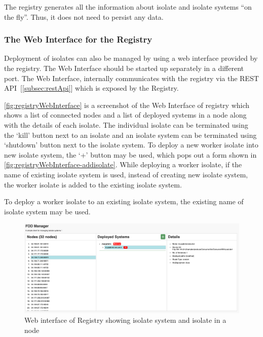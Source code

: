 The registry generates all the information about isolate and isolate systems “on the fly”. Thus, it does not need to persist any data.

  \subsubsection{The Web Interface for the Registry}
  \label{subsubsection:registryWebInterface}
  Deployment of isolates can also be managed by using a web interface provided by the registry. The Web Interface should be started up separately in a different port. The Web Interface, internally communicates with the registry via the REST API~[\ref{subsec:restApi}] which is exposed by the Registry.

  \autoref{fig:registryWebInterface} is a screenshot of the Web Interface of registry which shows a list of connected nodes and a list of deployed systems in a node along with the details of each isolate. The individual isolate can be terminated using the ‘kill’ button next to an isolate and an isolate system can be terminated using ‘shutdown’ button next to the isolate system. To deploy a new worker isolate into new isolate system, the ‘+’ button may be used, which pops out a form shown in \autoref{fig:registryWebInterface-addisolate}. While deploying a worker isolate, if the name of existing isolate system is used, instead of creating new isolate system, the worker isolate is added to the existing isolate system.

  To deploy a worker isolate to an existing isolate system, the existing name of isolate system may be used.

\begin{figure}[H]
  \centering
  \includegraphics[width=1\textwidth]{figures/webinterface}
  \caption[Web interface of Registry showing isolate system and isolate in a node]{Web interface of Registry showing isolate system and isolate in a node}
  \label{fig:registryWebInterface}
\end{figure}

